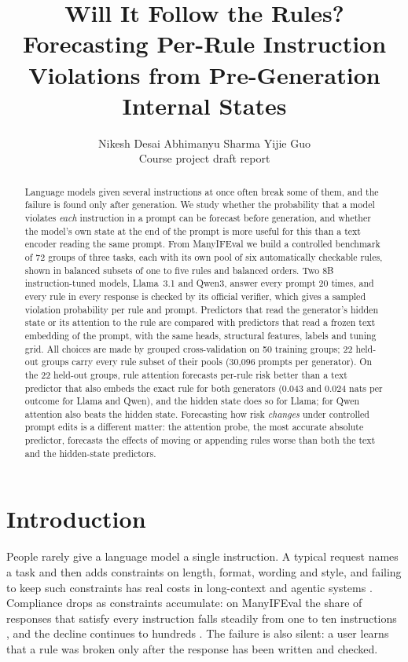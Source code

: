 \documentclass{article}
\title{Will It Follow the Rules? Forecasting Per-Rule Instruction\\ Violations from Pre-Generation Internal States}
\author{%
  Nikesh Desai \quad Abhimanyu Sharma \quad Yijie Guo\\
  Course project draft report\\
}
\begin{document}
\maketitle

\begin{abstract}
Language models given several instructions at once often break some of them, and the failure is found only after
generation. We study whether the probability that a model violates
\emph{each} instruction in a prompt can be forecast before generation, and whether the model's own state at the end
of the prompt is more useful for this than a text encoder reading the same prompt. From ManyIFEval we build a
controlled benchmark of 72 groups of three tasks, each with its own pool of six automatically checkable rules, shown
in balanced subsets of one to five rules and balanced orders. Two 8B instruction-tuned models, Llama~3.1 and Qwen3,
answer every prompt 20 times, and every rule in every response is checked by its official verifier, which gives a
sampled violation probability per rule and prompt. Predictors that read the generator's hidden state or its attention to
the rule are compared with predictors that read a frozen text embedding of the prompt, with the same heads, structural
features, labels and tuning grid. All choices are made by grouped cross-validation on 50 training
groups; 22 held-out groups carry every rule subset of their pools (30,096 prompts per generator). On the 22 held-out groups, rule attention forecasts per-rule risk better than a text predictor that also
embeds the exact rule for both generators (0.043 and 0.024 nats per outcome for Llama and Qwen), and the hidden state
does so for Llama; for Qwen attention also beats the hidden state. Forecasting how risk \emph{changes} under controlled
prompt edits is a different matter: the attention probe, the most accurate absolute predictor, forecasts the effects of
moving or appending rules worse than both the text and the hidden-state predictors.
\end{abstract}

\section{Introduction}
\label{sec:intro}

People rarely give a language model a single instruction. A typical request names a task and then adds constraints on
length, format, wording and style, and failing to keep such constraints has real costs in long-context and agentic
systems \citep{robinette2026repeatedly,wang2026compaction}. Compliance drops as constraints accumulate: on ManyIFEval
the share of responses that satisfy every instruction falls steadily from one to ten instructions
\citep{harada2025instructions}, and the decline continues to hundreds \citep{jaroslawicz2025many}. The failure is
also silent: a user learns that a rule was broken only after the response has been written and checked.
\end{document}
